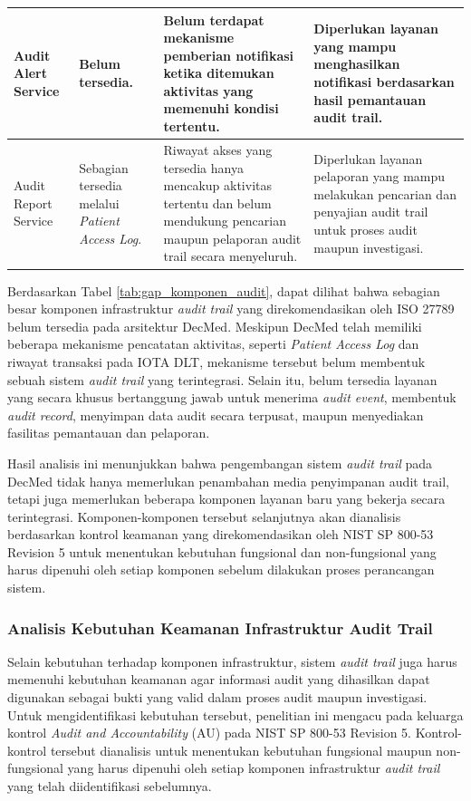 \begin{xltabular}{\textwidth}{|p{3.2cm}|p{3.2cm}|X|X|}
Audit Alert Service &
Belum tersedia. &
Belum terdapat mekanisme pemberian notifikasi ketika ditemukan aktivitas yang memenuhi kondisi tertentu. &
Diperlukan layanan yang mampu menghasilkan notifikasi berdasarkan hasil pemantauan audit trail.\\
\hline

Audit Report Service &
Sebagian tersedia melalui \textit{Patient Access Log}. &
Riwayat akses yang tersedia hanya mencakup aktivitas tertentu dan belum mendukung pencarian maupun pelaporan audit trail secara menyeluruh. &
Diperlukan layanan pelaporan yang mampu melakukan pencarian dan penyajian audit trail untuk proses audit maupun investigasi.\\
\hline

\end{xltabular}

Berdasarkan Tabel \ref{tab:gap_komponen_audit}, dapat dilihat bahwa sebagian besar komponen infrastruktur \textit{audit trail} yang direkomendasikan oleh ISO 27789 belum tersedia pada arsitektur DecMed. Meskipun DecMed telah memiliki beberapa mekanisme pencatatan aktivitas, seperti \textit{Patient Access Log} dan riwayat transaksi pada IOTA DLT, mekanisme tersebut belum membentuk sebuah sistem \textit{audit trail} yang terintegrasi. Selain itu, belum tersedia layanan yang secara khusus bertanggung jawab untuk menerima \textit{audit event}, membentuk \textit{audit record}, menyimpan data audit secara terpusat, maupun menyediakan fasilitas pemantauan dan pelaporan.

Hasil analisis ini menunjukkan bahwa pengembangan sistem \textit{audit trail} pada DecMed tidak hanya memerlukan penambahan media penyimpanan audit trail, tetapi juga memerlukan beberapa komponen layanan baru yang bekerja secara terintegrasi. Komponen-komponen tersebut selanjutnya akan dianalisis berdasarkan kontrol keamanan yang direkomendasikan oleh NIST SP 800-53 Revision 5 untuk menentukan kebutuhan fungsional dan non-fungsional yang harus dipenuhi oleh setiap komponen sebelum dilakukan proses perancangan sistem.

\subsubsection{Analisis Kebutuhan Keamanan Infrastruktur Audit Trail}

Selain kebutuhan terhadap komponen infrastruktur, sistem \textit{audit trail} juga harus memenuhi kebutuhan keamanan agar informasi audit yang dihasilkan dapat digunakan sebagai bukti yang valid dalam proses audit maupun investigasi. Untuk mengidentifikasi kebutuhan tersebut, penelitian ini mengacu pada keluarga kontrol \textit{Audit and Accountability} (AU) pada NIST SP 800-53 Revision 5. Kontrol-kontrol tersebut dianalisis untuk menentukan kebutuhan fungsional maupun non-fungsional yang harus dipenuhi oleh setiap komponen infrastruktur \textit{audit trail} yang telah diidentifikasi sebelumnya.

